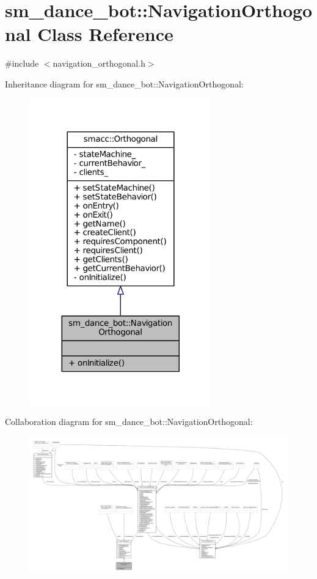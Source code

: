 \hypertarget{classsm__dance__bot_1_1NavigationOrthogonal}{}\section{sm\+\_\+dance\+\_\+bot\+:\+:Navigation\+Orthogonal Class Reference}
\label{classsm__dance__bot_1_1NavigationOrthogonal}


{\ttfamily \#include $<$navigation\+\_\+orthogonal.\+h$>$}



Inheritance diagram for sm\+\_\+dance\+\_\+bot\+:\+:Navigation\+Orthogonal\+:
\nopagebreak
\begin{figure}[H]
\begin{center}
\leavevmode
\includegraphics[width=224pt]{classsm__dance__bot_1_1NavigationOrthogonal__inherit__graph}
\end{center}
\end{figure}


Collaboration diagram for sm\+\_\+dance\+\_\+bot\+:\+:Navigation\+Orthogonal\+:
\nopagebreak
\begin{figure}[H]
\begin{center}
\leavevmode
\includegraphics[width=350pt]{classsm__dance__bot_1_1NavigationOrthogonal__coll__graph}
\end{center}
\end{figure}
